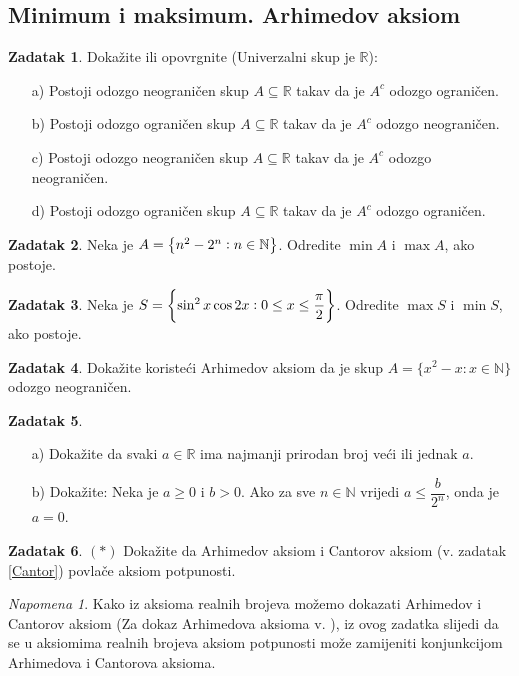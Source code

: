 \documentclass{book}
\let\originalleft\left
\let\originalright\right
\renewcommand{\left}{\mathopen{}\mathclose\bgroup\originalleft}
\renewcommand{\right}{\aftergroup\egroup\originalright}
\theoremstyle{definition}
\theoremstyle{definition}
\newtheorem{exercise}{Zadatak}
\theoremstyle{remark}
\newtheorem{remark}{Napomena}
\begin{document}
\subsection*{Minimum i maksimum. Arhimedov aksiom}
\begin{exercise} Dokažite ili opovrgnite (Univerzalni skup je $\mathbb{R}$):
\begin{itemize}
\item[a)] Postoji odozgo neograničen skup $A\subseteq \mathbb{R}$ takav da je $A^c$ odozgo ograničen.
\item[b)] Postoji odozgo ograničen skup $A\subseteq \mathbb{R}$ takav da je $A^c$ odozgo neograničen.
\item[c)] Postoji odozgo neograničen skup $A\subseteq \mathbb{R}$ takav da je $A^c$ odozgo neograničen.
\item[d)] Postoji odozgo ograničen skup $A\subseteq \mathbb{R}$ takav da je $A^c$ odozgo ograničen.
\end{itemize}
\end{exercise}
\begin{exercise}
Neka je $A=\left\{n^2-2^n : n\in \mathbb{N}\right\}$. Odredite $\min{A}$ i $\max{A}$, ako postoje.
\end{exercise}
\begin{exercise}
Neka je $S=\left\{\sin^2{x}\cos{2x} : 0\leq x\leq \dfrac{\pi}{2}\right\}$. Odredite $\max{S}$ i $\min{S}$, ako postoje.
\end{exercise}
\begin{exercise}
Dokažite koristeći Arhimedov aksiom da je skup $A=\{x^2-x : x\in \mathbb{N}\}$ odozgo neograničen.
\end{exercise}
\begin{exercise} \textbf{}
\begin{itemize}
\item[a)] Dokažite da svaki $a\in \mathbb{R}$ ima najmanji prirodan broj veći ili jednak $a$.
\item[b)] Dokažite: Neka je $a\geq 0$ i $b>0$. Ako za sve $n\in \mathbb{N}$ vrijedi $a\leq \dfrac{b}{2^n}$, onda je $a=0$.
\end{itemize}
\end{exercise}
\begin{exercise} $(*)$
Dokažite da Arhimedov aksiom i Cantorov aksiom (v. zadatak \ref{Cantor}) povlače aksiom potpunosti.
\end{exercise}
\begin{remark}
Kako iz aksioma realnih brojeva možemo dokazati Arhimedov i Cantorov aksiom (Za dokaz Arhimedova aksioma v. \cite{3}), iz ovog zadatka slijedi da se u aksiomima realnih brojeva aksiom potpunosti može zamijeniti konjunkcijom Arhimedova i Cantorova aksioma.
\end{remark}
\end{document}

